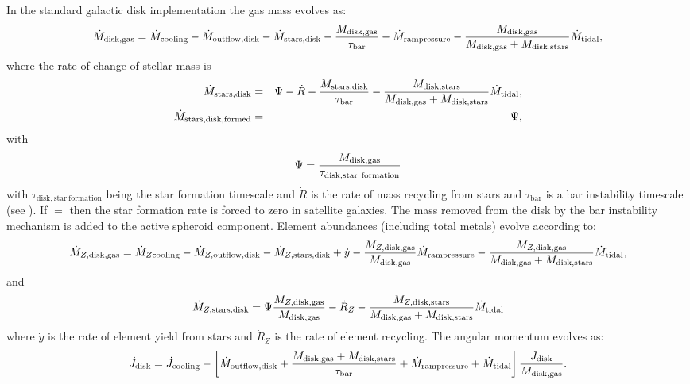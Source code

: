 In the standard galactic disk implementation the gas mass evolves as:
\begin{equation}
 \dot{M}_\mathrm{disk, gas} = \dot{M}_\mathrm{cooling} - \dot{M}_\mathrm{outflow, disk} - \dot{M}_\mathrm{stars, disk} - {M_\mathrm{disk, gas}\over \tau_\mathrm{bar}} - \dot{M}_\mathrm{ram pressure} - {M_\mathrm{disk, gas} \over M_\mathrm{disk, gas} + M_\mathrm{disk, stars}} \dot{M}_\mathrm{tidal},
\end{equation}
where the rate of change of stellar mass is
\begin{eqnarray}
  \dot{M}_\mathrm{stars, disk} &=& \Psi - \dot{R} - {M_\mathrm{stars,disk} \over \tau_\mathrm{bar}} - {M_\mathrm{disk, stars} \over M_\mathrm{disk, gas} + M_\mathrm{disk, stars}} \dot{M}_\mathrm{tidal}, \\
  \dot{M}_\mathrm{stars, disk, formed } &=& \Psi,
\end{eqnarray}
with
\begin{equation}
 \Psi = {M_\mathrm{disk, gas} \over \tau_\mathrm{disk, star~formation}}
\end{equation}
with $\tau_\mathrm{disk, star~formation}$ being the star formation timescale and $\dot{R}$ is the rate of mass recycling from stars and $\tau_\mathrm{bar}$ is a bar instability timescale (see ). If \mono{[diskStarFormationInSatellites]}$=$ then the star formation rate is forced to zero in satellite galaxies. The mass removed from the disk by the bar instability mechanism is added to the active spheroid component.
Element abundances (including total metals) evolve according to:
\begin{equation}
  \dot{M}_{Z, \mathrm{disk, gas}} = \dot{M}_{Z \mathrm{cooling}} - \dot{M}_{Z, \mathrm{outflow, disk}} - \dot{M}_{Z, \mathrm{stars, disk}} + \dot{y} - {M_{Z, \mathrm{disk, gas}} \over M_\mathrm{disk, gas}} \dot{M}_\mathrm{ram pressure} - {M_{Z, \mathrm{disk, gas}} \over M_\mathrm{disk, gas} + M_\mathrm{disk, stars}} \dot{M}_\mathrm{tidal},
\end{equation}
and
\begin{equation}
 \dot{M}_{Z, \mathrm{stars, disk}} = \Psi {M_{Z, \mathrm{disk, gas}} \over M_\mathrm{disk, gas}} - \dot{R}_Z - {M_{Z, \mathrm{disk, stars}} \over M_\mathrm{disk, gas} + M_\mathrm{disk, stars}} \dot{M}_\mathrm{tidal}
\end{equation}
where $\dot{y}$ is the rate of element yield from stars and $\dot{R}_Z$ is the rate of element recycling. The angular momentum evolves as:
\begin{equation}
 \dot{J}_\mathrm{disk} = \dot{J}_\mathrm{cooling} - \left[ \dot{M}_\mathrm{outflow, disk} + {M_\mathrm{disk, gas}  + M_\mathrm{disk, stars} \over \tau_\mathrm{bar}} + \dot{M}_\mathrm{ram pressure} + \dot{M}_\mathrm{tidal}\right] {J_\mathrm{disk} \over M_\mathrm{disk, gas}}.
\end{equation}
